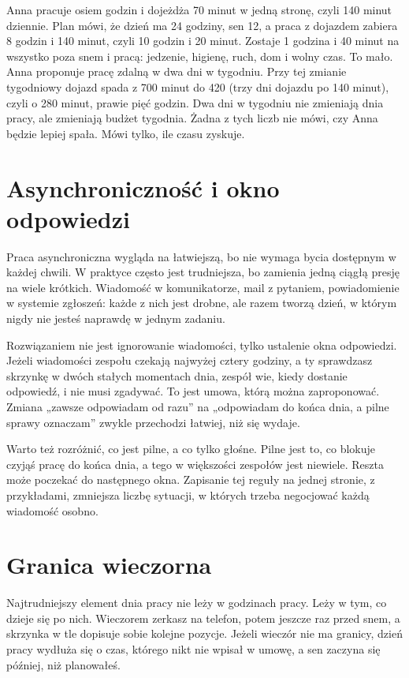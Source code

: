 \begin{przyklad}
Anna pracuje osiem godzin i dojeżdża 70 minut w jedną stronę, czyli 140 minut dziennie. Plan mówi, że dzień ma 24 godziny, sen 12, a praca z dojazdem zabiera 8 godzin i 140 minut, czyli 10 godzin i 20 minut. Zostaje 1 godzina i 40 minut na wszystko poza snem i pracą: jedzenie, higienę, ruch, dom i wolny czas. To mało. Anna proponuje pracę zdalną w dwa dni w tygodniu. Przy tej zmianie tygodniowy dojazd spada z 700 minut do 420 (trzy dni dojazdu po 140 minut), czyli o 280 minut, prawie pięć godzin. Dwa dni w tygodniu nie zmieniają dnia pracy, ale zmieniają budżet tygodnia. Żadna z tych liczb nie mówi, czy Anna będzie lepiej spała. Mówi tylko, ile czasu zyskuje.
\end{przyklad}

\section{Asynchroniczność i okno odpowiedzi}

Praca asynchroniczna wygląda na łatwiejszą, bo nie wymaga bycia dostępnym w każdej chwili. W praktyce często jest trudniejsza, bo zamienia jedną ciągłą presję na wiele krótkich. Wiadomość w komunikatorze, mail z pytaniem, powiadomienie w systemie zgłoszeń: każde z nich jest drobne, ale razem tworzą dzień, w którym nigdy nie jesteś naprawdę w jednym zadaniu.

Rozwiązaniem nie jest ignorowanie wiadomości, tylko ustalenie okna odpowiedzi. Jeżeli wiadomości zespołu czekają najwyżej cztery godziny, a ty sprawdzasz skrzynkę w dwóch stałych momentach dnia, zespół wie, kiedy dostanie odpowiedź, i nie musi zgadywać. To jest umowa, którą można zaproponować. Zmiana „zawsze odpowiadam od razu” na „odpowiadam do końca dnia, a pilne sprawy oznaczam” zwykle przechodzi łatwiej, niż się wydaje.

Warto też rozróżnić, co jest pilne, a co tylko głośne. Pilne jest to, co blokuje czyjąś pracę do końca dnia, a tego w większości zespołów jest niewiele. Reszta może poczekać do następnego okna. Zapisanie tej reguły na jednej stronie, z przykładami, zmniejsza liczbę sytuacji, w których trzeba negocjować każdą wiadomość osobno.

\section{Granica wieczorna}

Najtrudniejszy element dnia pracy nie leży w godzinach pracy. Leży w tym, co dzieje się po nich. Wieczorem zerkasz na telefon, potem jeszcze raz przed snem, a skrzynka w tle dopisuje sobie kolejne pozycje. Jeżeli wieczór nie ma granicy, dzień pracy wydłuża się o czas, którego nikt nie wpisał w umowę, a sen zaczyna się później, niż planowałeś.

